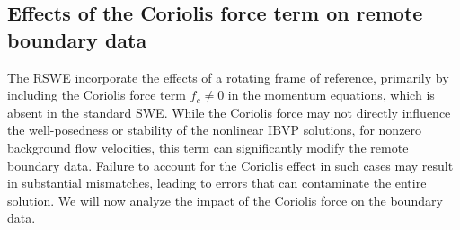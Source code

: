 \documentclass{article}
\numberwithin{equation}{section}
\theoremstyle{definition}
\begin{document}
\subsection{Effects of the  Coriolis force term on remote boundary data}\label{sec:EffectsofCoriolis}
The RSWE incorporate the effects of a rotating frame of reference, primarily by including the Coriolis force term $f_c\ne 0$ in the momentum equations, which is absent in the standard SWE. While the Coriolis force may not directly influence the well-posedness or stability of the nonlinear IBVP solutions, for nonzero background flow velocities, this term can significantly modify the remote boundary data. Failure to account for the Coriolis effect in such cases may result in substantial mismatches, leading to errors that can contaminate the entire solution. We will now analyze the impact of the Coriolis force on the boundary data.
\end{document}
